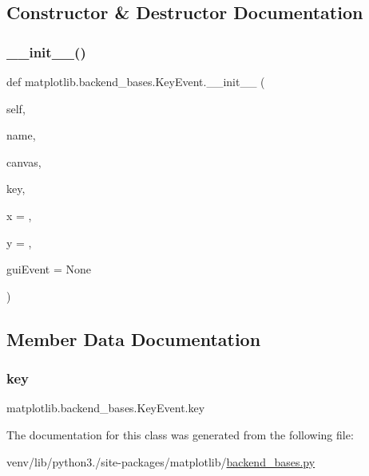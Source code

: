 \subsection{Constructor \& Destructor Documentation}
\mbox{\label{classmatplotlib_1_1backend__bases_1_1KeyEvent_afab0554b1d029f72d60ef34bcca47211}} 
\subsubsection{\texorpdfstring{\+\_\+\+\_\+init\+\_\+\+\_\+()}{\_\_init\_\_()}}
{\footnotesize\ttfamily def matplotlib.\+backend\+\_\+bases.\+Key\+Event.\+\_\+\+\_\+init\+\_\+\+\_\+ (\begin{DoxyParamCaption}\item[{}]{self,  }\item[{}]{name,  }\item[{}]{canvas,  }\item[{}]{key,  }\item[{}]{x = {},  }\item[{}]{y = {},  }\item[{}]{gui\+Event = {\ttfamily None} }\end{DoxyParamCaption})}



\subsection{Member Data Documentation}
\mbox{\label{classmatplotlib_1_1backend__bases_1_1KeyEvent_a56e60bbb8d0a52741daff43b4e3320db}} 
\subsubsection{\texorpdfstring{key}{key}}
{\footnotesize\ttfamily matplotlib.\+backend\+\_\+bases.\+Key\+Event.\+key}



The documentation for this class was generated from the following file\+:\begin{DoxyCompactItemize}
\item 
venv/lib/python3./site-\/packages/matplotlib/\hyperlink{backend__bases_8py}{backend\+\_\+bases.\+py}\end{DoxyCompactItemize}

